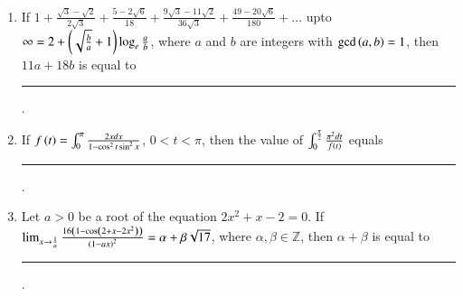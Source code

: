 \documentclass[journal,12pt,onecolumn]{IEEEtran}
\theoremstyle{remark}
\begin{document}
\begin{enumerate}
\hfill{}

\item If $1+\frac{\sqrt{3}-\sqrt{2}}{2\sqrt{3}}+\frac{5-2\sqrt{6}}{18}+\frac{9\sqrt{3}-11\sqrt{2}}{36\sqrt{3}}+\frac{49-20\sqrt{6}}{180}+\dots$ upto $\infty=2+\left(\sqrt{\frac{b}{a}}+1\right)\log_e{\frac{a}{b}}$, where $a$ and $b$ are integers with $\gcd\left(a,b\right)=1$, then $11a+18b$ is equal to \rule{1cm}{0.15mm}. 

\hfill{}

\item If $f\left(t\right)=\int_{0}^{\pi}\frac{2xdx}{1-\cos^{2}t\sin^{2}x}$, $0<t<\pi$, then the value of $\int_{0}^{\frac{\pi}{2}}\frac{\pi^{2}dt}{f\left(t\right)}$ equals \rule{1cm}{0.15mm}.

\hfill{}

\item Let $a>0$ be a root of the equation $2x^2+x-2=0$. If $\lim_{x\to\frac{1}{a}}\frac{16\left(1-\cos\left(2+x-2x^2\right)\right)}{\left(1-ax\right)^2}=\alpha+\beta\sqrt{17}$, where $\alpha,\beta\in\mathbb{Z}$, then $\alpha+\beta$ is equal to \rule{1cm}{0.15mm}.

\hfill{}

\end{enumerate}
\end{document}
